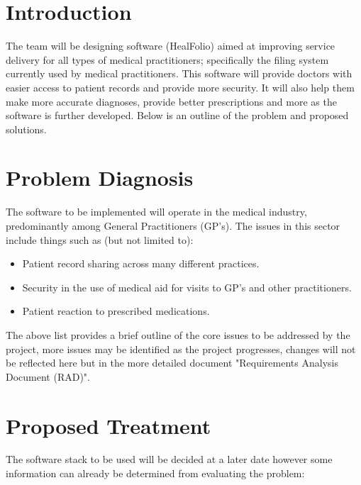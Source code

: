 \documentclass[a4paper]{article}
\begin{document}
\setlength\parindent{24pt}

\section*{Introduction}

The team will be designing software (HealFolio) aimed at improving service delivery for all types of medical practitioners; specifically the filing system currently used by medical practitioners. This software will provide doctors with easier access to patient records and provide more security. It will also help them make more accurate diagnoses, provide better prescriptions and more as the software is further developed. Below is an outline of the problem and proposed solutions.

\section*{Problem Diagnosis}

The software to be implemented will operate in the medical industry, predominantly among General Practitioners (GP's). The issues in this sector include things such as (but not limited to):

\begin{itemize}

\item Patient record sharing across many different practices.

\item Security in the use of medical aid for visits to GP's and other practitioners.

\item Patient reaction to prescribed medications.

\end{itemize}

The above list provides a brief outline of the core issues to be addressed by the project, more issues may be identified as the project progresses, changes will not be reflected here but in the more detailed document "Requirements Analysis Document (RAD)".

\section*{Proposed Treatment}

The software stack to be used will be decided at a later date however some information can already be determined from evaluating the problem:
\end{document}
